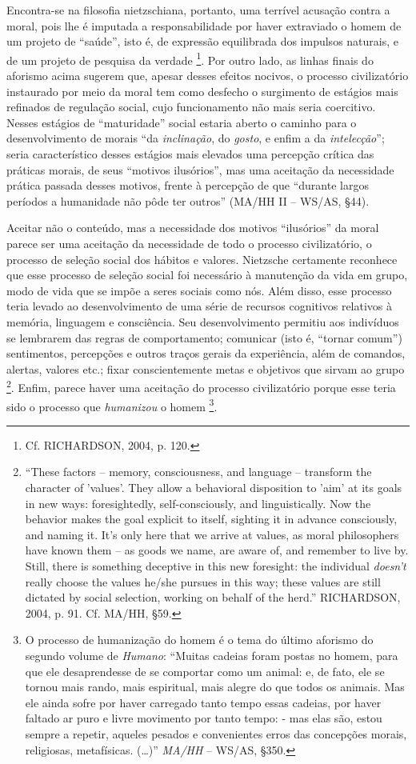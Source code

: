 \documentclass[
	12pt,				%
	openright,			%
	oneside,			%
	a4paper,			%
	english,			%
	french,				%
	spanish,			%
	brazil				%
	]{abntex2}
\begin{document}
Encontra-se na filosofia nietzschiana, portanto, uma terrível acusação contra a moral, pois lhe é imputada a responsabilidade por haver extraviado o homem de um projeto de “saúde”, isto é, de expressão equilibrada dos impulsos naturais, e de um projeto de pesquisa da verdade
\footnote{Cf. RICHARDSON, 2004, p. 120.}. 
Por outro lado, as linhas finais do aforismo acima sugerem que, apesar desses efeitos nocivos, o processo civilizatório instaurado por meio da moral tem como desfecho o surgimento de estágios mais refinados de regulação social, cujo funcionamento não mais seria coercitivo. Nesses estágios de “maturidade” social estaria aberto o caminho para o desenvolvimento de morais “da \textit{inclinação}, do \textit{gosto}, e enfim a da \textit{intelecção}”; seria característico desses estágios mais elevados uma percepção crítica das práticas morais, de seus “motivos ilusórios”, mas uma aceitação da necessidade prática passada desses motivos, frente à percepção de que “durante largos períodos a humanidade não pôde ter outros” (MA/HH II – WS/AS, §44).

Aceitar não o conteúdo, mas a necessidade dos motivos “ilusórios” da moral parece ser uma aceitação da necessidade de todo o processo civilizatório, o processo de seleção social dos hábitos e valores. Nietzsche certamente reconhece que esse processo de seleção social foi necessário à manutenção da vida em grupo, modo de vida que se impõe a seres sociais como nós. Além disso, esse processo teria levado ao desenvolvimento de uma série de recursos cognitivos relativos à memória, linguagem e consciência. Seu desenvolvimento permitiu aos indivíduos se lembrarem das regras de comportamento; comunicar (isto é, “tornar comum”) sentimentos, percepções e outros traços gerais da experiência, além de comandos, alertas, valores etc.; fixar conscientemente metas e objetivos que sirvam ao grupo
\footnote{“These factors – memory, consciousness, and language – transform the character of 'values'. They allow a behavioral disposition to 'aim' at its goals in new ways: foresightedly, self-consciously, and linguistically. Now the behavior makes the goal explicit to itself, sighting it in advance consciously, and naming it. It's only here that we arrive at values, as moral philosophers have known them – as goods we name, are aware of, and remember to live by. Still, there is something deceptive in this new foresight: the individual \textit{doesn't} really choose the values he/she pursues in this way; these values are still dictated by social selection, working on behalf of the herd.” RICHARDSON, 2004, p. 91. Cf. MA/HH, §59.}. 
Enfim, parece haver uma aceitação do processo civilizatório porque esse teria sido o processo que \textit{humanizou} o homem
\footnote{O processo de humanização do homem é o tema do último aforismo do segundo volume de \textit{Humano}: “Muitas cadeias foram postas no homem, para que ele desaprendesse de se comportar como um animal: e, de fato, ele se tornou mais rando, mais espiritual, mais alegre do que todos os animais. Mas ele ainda sofre por haver carregado tanto tempo essas cadeias, por haver faltado ar puro e livre movimento por tanto tempo: - mas elas são, estou sempre a repetir, aqueles pesados e convenientes erros das concepções morais, religiosas, metafísicas. (…)” \textit{MA/HH} – WS/AS, §350.}.
\end{document}
